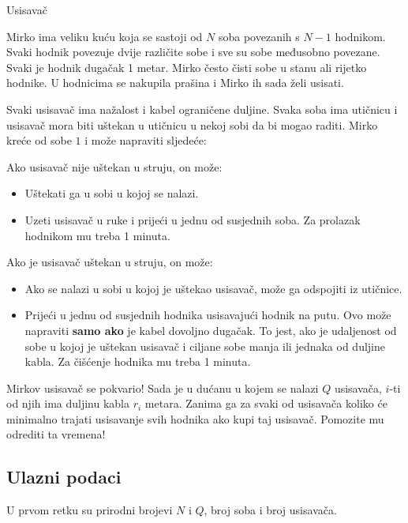 \begin{statement}[
  problempoints=100,
  timelimit=1 sekunda,
  memorylimit=512 MiB,
]{Usisavač}

Mirko ima veliku kuću koja se sastoji od $N$ soba povezanih s $N - 1$ hodnikom. Svaki hodnik povezuje dvije različite sobe i sve su sobe međusobno povezane. Svaki je hodnik dugačak 1 metar. Mirko često čisti sobe u stanu ali rijetko hodnike. U hodnicima se nakupila prašina i Mirko ih sada želi usisati. 

Svaki usisavač ima nažalost i kabel ograničene duljine. Svaka soba ima utičnicu i usisavač mora biti uštekan u utičnicu u nekoj sobi da bi mogao raditi. Mirko kreće od sobe $1$ i može napraviti sljedeće:

Ako usisavač nije uštekan u struju, on može:
\begin{itemize}
	\item Uštekati ga u sobi u kojoj se nalazi. 
	\item Uzeti usisavač u ruke i prijeći u jednu od susjednih soba. Za prolazak hodnikom mu treba 1 minuta.
\end{itemize}

Ako je usisavač uštekan u struju, on može:
\begin{itemize}
	\item Ako se nalazi u sobi u kojoj je uštekao usisavač, može ga odspojiti iz utičnice.
	\item Prijeći u jednu od susjednih hodnika usisavajući hodnik na putu. Ovo može napraviti \textbf{samo ako} je kabel dovoljno dugačak. To jest, ako je udaljenost od sobe u kojoj je uštekan usisavač i ciljane sobe manja ili jednaka od duljine kabla. Za čišćenje hodnika mu treba 1 minuta.
\end{itemize}

Mirkov usisavač se pokvario! Sada je u dućanu u kojem se nalazi $Q$ usisavača, $i$-ti od njih ima duljinu kabla $r_i$ metara. Zanima ga za svaki od usisavača koliko će minimalno trajati usisavanje svih hodnika ako kupi taj usisavač. Pomozite mu odrediti ta vremena!

\subsection*{Ulazni podaci}

U prvom retku su prirodni brojevi $N$ i $Q$, broj soba i broj usisavača.


\end{statement}
